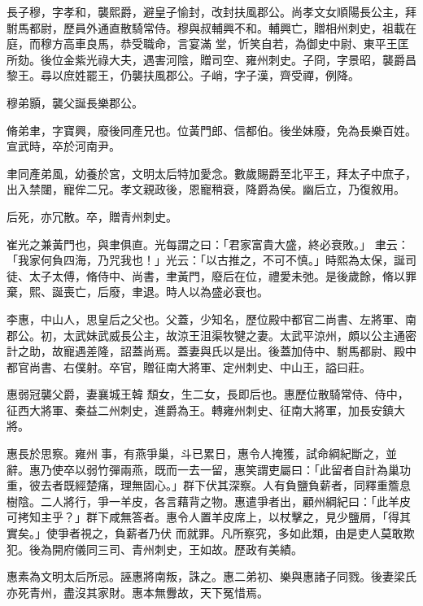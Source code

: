 \begin{pinyinscope}
 長子穆，字孝和，襲熙爵，避皇子愉封，改封扶風郡公。尚孝文女順陽長公主，拜駙馬都尉，歷員外通直散騎常侍。穆與叔輔興不和。輔興亡，贈相州刺史，祖載在庭，而穆方高車良馬，恭受職命，言宴滿
 堂，忻笑自若，為御史中尉、東平王匡所劾。後位金紫光祿大夫，遇害河陰，贈司空、雍州刺史。子冏，字景昭，襲爵昌黎王。尋以庶姓罷王，仍襲扶風郡公。子峭，字子漢，齊受禪，例降。



 穆弟顥，襲父誕長樂郡公。



 脩弟聿，字寶興，廢後同產兄也。位黃門郎、信都伯。後坐妹廢，免為長樂百姓。宣武時，卒於河南尹。



 聿同產弟風，幼養於宮，文明太后特加愛念。數歲賜爵至北平王，拜太子中庶子，出入禁闥，寵侔二兄。孝文親政後，恩寵稍衰，降爵為侯。幽后立，乃復敘用。



 后死，亦冗散。卒，贈青州刺史。



 崔光之兼黃門也，與聿俱直。光每謂之曰：「君家富貴大盛，終必衰敗。」
 聿云：「我家何負四海，乃咒我也！」光云：「以古推之，不可不慎。」時熙為太保，誕司徒、太子太傅，脩侍中、尚書，聿黃門，廢后在位，禮愛未弛。是後歲餘，脩以罪棄，熙、誕喪亡，后廢，聿退。時人以為盛必衰也。



 李惠，中山人，思皇后之父也。父蓋，少知名，歷位殿中都官二尚書、左將軍、南郡公。初，太武妹武威長公主，故涼王沮渠牧犍之妻。太武平涼州，頗以公主通密計之助，故寵遇差隆，詔蓋尚焉。蓋妻與氏以是出。後蓋加侍中、駙馬都尉、殿中都官尚書、右僕射。卒官，贈征南大將軍、定州刺史、中山王，謚曰莊。



 惠弱冠襲父爵，妻襄城王韓
 頹女，生二女，長即后也。惠歷位散騎常侍、侍中，征西大將軍、秦益二州刺史，進爵為王。轉雍州刺史、征南大將軍，加長安鎮大將。



 惠長於思察。雍州事，有燕爭巢，斗已累日，惠令人掩獲，試命綱紀斷之，並辭。惠乃使卒以弱竹彈兩燕，既而一去一留，惠笑謂吏屬曰：「此留者自計為巢功重，彼去者既經楚痛，理無固心。」群下伏其深察。人有負鹽負薪者，同釋重簷息樹陰。二人將行，爭一羊皮，各言藉背之物。惠遣爭者出，顧州綱紀曰：「此羊皮可拷知主乎？」群下咸無答者。惠令人置羊皮席上，以杖擊之，見少鹽屑，「得其實矣。」使爭者視之，負薪者乃伏
 而就罪。凡所察究，多如此類，由是吏人莫敢欺犯。後為開府儀同三司、青州刺史，王如故。歷政有美績。



 惠素為文明太后所忌。誣惠將南叛，誅之。惠二弟初、樂與惠諸子同戮。後妻梁氏亦死青州，盡沒其家財。惠本無釁故，天下冤惜焉。




\end{pinyinscope}
